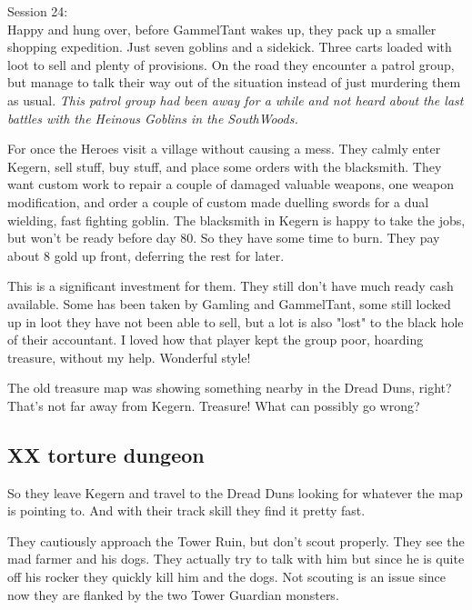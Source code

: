 Session 24:\\                                                           %
Happy and hung over, before GammelTant wakes up, they pack up a smaller shopping expedition. Just seven goblins and a sidekick. Three carts loaded with loot to sell and plenty of provisions. On the road they encounter a patrol group, but manage to talk their way out of the situation instead of just murdering them as usual. \emph{This patrol group had been away for a while and not heard about the last battles with the Heinous Goblins in the SouthWoods.}

For once the Heroes visit a village without causing a mess. They calmly enter Kegern, sell stuff, buy stuff, and place some orders with the blacksmith. They want custom work to repair a couple of damaged valuable weapons, one weapon modification, and order a couple of custom made duelling swords for a dual wielding, fast fighting goblin. The blacksmith in Kegern is happy to take the jobs, but won't be ready before day 80. So they have some time to burn. They pay about 8 gold up front, deferring the rest for later.

\begin{readoutloud}
This is a significant investment for them. They still don't have much ready cash available. Some has been taken by Gamling and GammelTant, some still locked up in loot they have not been able to sell, but a lot is also "lost" to the black hole of their accountant. I loved how that player kept the group poor, hoarding treasure, without my help. Wonderful style!
\end{readoutloud}

The old treasure map was showing something nearby in the Dread Duns, right? That's not far away from Kegern. Treasure! What can possibly go wrong?


\subsection*{XX torture dungeon}

So they leave Kegern and travel to the Dread Duns looking for whatever the map is pointing to. And with their track skill they find it pretty fast.

They cautiously approach the Tower Ruin, but don't scout properly. They see the mad farmer and his dogs. They actually try to talk with him but since he is quite off his rocker they quickly kill him and the dogs. Not scouting is an issue since now they are flanked by the two Tower Guardian monsters.

